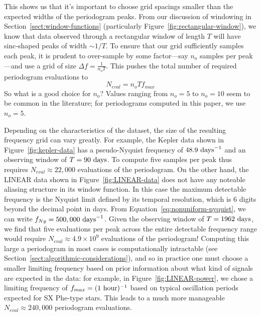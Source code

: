 \documentclass[preprint]{aastex}
\newcommand{\fig}[1]{Figure~\ref{fig:#1}}
\newcommand{\Eq}[1]{Equation~\ref{eq:#1}}
\newcommand{\eq}[1]{\Eq{#1}}
\newcommand{\eqlabel}[1]{\label{eq:#1}}
\newcommand{\Sect}[1]{Section~\ref{sect:#1}}
\newcommand{\sect}[1]{\Sect{#1}}
\begin{document}
This shows us that it's important to choose grid spacings smaller than the
expected widths of the periodogram peaks.
From our discussion of windowing in \sect{window-functions}
(particularly \fig{rectangular-window}), we know that data observed through a
rectangular window of length $T$ will have sinc-shaped peaks of width
${\sim}1/T$.
To ensure that our grid sufficiently samples each peak, it is prudent to
over-sample by some factor---say $n_o$ samples per peak---and
use a grid of size $\Delta f = \frac{1}{n_o T}$.
This pushes the total number of required periodogram evaluations to
\begin{equation}
  \eqlabel{n-eval}
  N_{eval} = n_o T f_{max}
\end{equation}
So what is a good choice for $n_o$?
Values ranging from $n_o=5$ \citep{Schwarzenberg-Czerny96, VanderPlas2015}
to $n_o=10$ \citep{Debosscher07, Richards12}
seem to be common in the literature;
for periodograms computed in this paper, we use $n_o=5$.

Depending on the characteristics of the dataset, the size of the resulting
frequency grid can vary greatly.
For example, the Kepler data shown in \fig{kepler-data} has a pseudo-Nyquist
frequency of $48.9\ {\rm days}^{-1}$ and
an observing window of $T = 90\ {\rm days}$.
To compute five samples per peak thus requires $N_{eval} \approx 22,000$
evaluations of the periodogram.
On the other hand, the LINEAR data shown in \fig{LINEAR-data} does not have
any noteable aliasing structure in its window function.
In this case the maximum detectable frequency is the Nyquist limit defined
by its temporal resolution, which is 6 digits beyond the decimal point in days.
From \eq{nonuniform-nyquist}, we can write $f_{Ny} = 500,000\ {\rm days}^{-1}$.
Given the observing window of $T = 1962\ {\rm days}$, we find that five
evaluations per peak across the entire detectable frequency range
would require $N_{eval} \approx 4.9 \times 10^9$ evaluations of the periodogram!
Computing this large a periodogram in most cases is computationally intractable
(see \sect{algorithmic-considerations}), and so in practice one must choose
a smaller limiting frequency based on prior information about what kind of
signals are expected in the data: for example, in \fig{LINEAR-power}, we chose
a limiting frequency of $f_{max} = (1\ {\rm hour})^{-1}$ based on typical
oscillation periods expected for SX Phe-type stars.
This leads to a much more manageable
$N_{eval} \approx 240,000$ periodogram evaluations.
\end{document}
